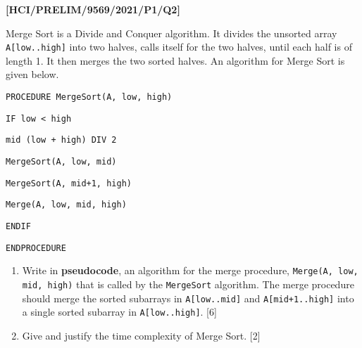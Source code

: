 \item \textbf{{[}HCI/PRELIM/9569/2021/P1/Q2{]}}

Merge Sort is a Divide and Conquer algorithm. It divides the unsorted
array \texttt{A{[}low..high{]}} into two halves, calls itself for
the two halves, until each half is of length 1. It then merges the
two sorted halves. An algorithm for Merge Sort is given below. 

\noindent %
\noindent\begin{minipage}[t]{1\columnwidth}%
\texttt{PROCEDURE MergeSort(A, low, high) }

\texttt{\qquad{}IF low < high }

\texttt{\qquad{}\qquad{}mid \textleftarrow{} (low + high) DIV 2 }

\texttt{\qquad{}\qquad{}MergeSort(A, low, mid) }

\texttt{\qquad{}\qquad{}MergeSort(A, mid+1, high) }

\texttt{\qquad{}\qquad{}Merge(A, low, mid, high) }

\texttt{\qquad{}ENDIF }

\texttt{ENDPROCEDURE }%
\end{minipage}
\begin{enumerate}
\item Write in \textbf{pseudocode}, an algorithm for the merge procedure,
\texttt{Merge(A, low, mid, high)} that is called by the \texttt{MergeSort}
algorithm. The merge procedure should merge the sorted subarrays in
\texttt{A{[}low..mid{]}} and \texttt{A{[}mid+1..high{]}} into a single
sorted subarray in \texttt{A{[}low..high{]}}. \hfill{}{[}6{]}
\item Give and justify the time complexity of Merge Sort. \hfill{}{[}2{]}
\end{enumerate}